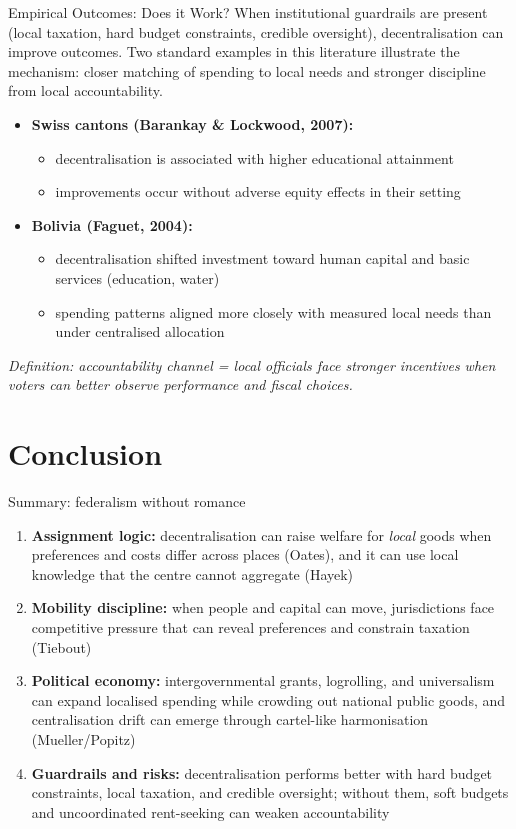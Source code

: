 \documentclass[10pt]{beamer}
\begin{document}
\begin{frame}{Empirical Outcomes: Does it Work?}
When institutional guardrails are present (local taxation, hard budget constraints, credible oversight), decentralisation can improve outcomes.
Two standard examples in this literature illustrate the mechanism: closer matching of spending to local needs and stronger discipline from local accountability.

\begin{itemize}
\item \textbf{Swiss cantons (Barankay \& Lockwood, 2007):}
\begin{itemize}
\item decentralisation is associated with higher educational attainment
\item improvements occur without adverse equity effects in their setting
\end{itemize}
\item \textbf{Bolivia (Faguet, 2004):}
\begin{itemize}
\item decentralisation shifted investment toward human capital and basic services (education, water)
\item spending patterns aligned more closely with measured local needs than under centralised allocation
\end{itemize}
\end{itemize}

\vspace{0.1cm}
\footnotesize
\textit{Definition: accountability channel = local officials face stronger incentives when voters can better observe performance and fiscal choices.}
\end{frame}

\section{Conclusion}

\begin{frame}{Summary: federalism without romance}
\begin{enumerate}
\item \textbf{Assignment logic:} decentralisation can raise welfare for \textit{local} goods when preferences and costs differ across places (Oates), and it can use local knowledge that the centre cannot aggregate (Hayek)
\item \textbf{Mobility discipline:} when people and capital can move, jurisdictions face competitive pressure that can reveal preferences and constrain taxation (Tiebout)
\item \textbf{Political economy:} intergovernmental grants, logrolling, and universalism can expand localised spending while crowding out national public goods, and centralisation drift can emerge through cartel-like harmonisation (Mueller/Popitz)
\item \textbf{Guardrails and risks:} decentralisation performs better with hard budget constraints, local taxation, and credible oversight; without them, soft budgets and uncoordinated rent-seeking can weaken accountability
\end{enumerate}
\end{frame}
\end{document}

